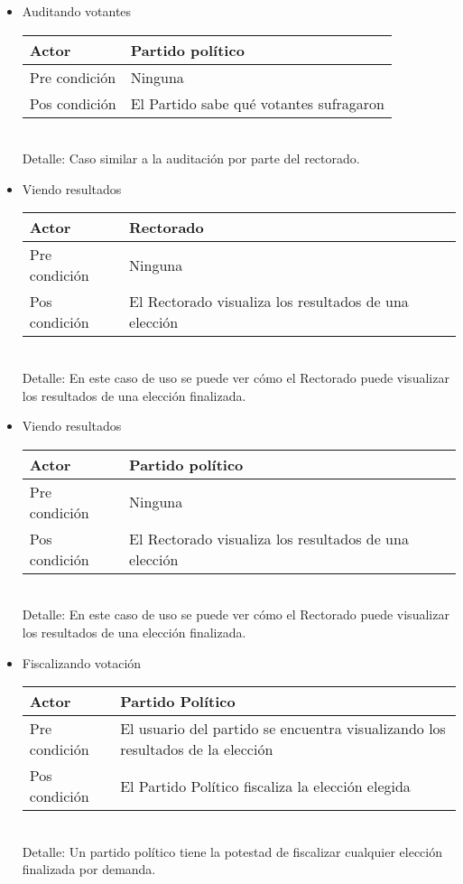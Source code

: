 \begin{itemize}
\bigskip
\item Auditando votantes
\begin{center}
\begin{tabular}{ll}
Actor & Partido político \\
\hline
Pre condición & Ninguna\\
\hline
Pos condición & El Partido sabe qu\'e votantes sufragaron \\
\hline
\end{tabular}
\medskip
\\
Detalle: Caso similar a la auditación por parte del rectorado.
\end{center} 

\bigskip
\item Viendo resultados
\begin{center}
\begin{tabular}{ll}
Actor & Rectorado \\
\hline
Pre condición & Ninguna\\
\hline
Pos condición & El Rectorado visualiza los resultados de una elección \\
\hline
\end{tabular}
\medskip
\\
Detalle: En este caso de uso se puede ver cómo el Rectorado puede visualizar los resultados de una elección finalizada.
\end{center} 

\bigskip
\item Viendo resultados
\begin{center}
\begin{tabular}{ll}
Actor & Partido político \\
\hline
Pre condición & Ninguna\\
\hline
Pos condición & El Rectorado visualiza los resultados de una elección \\
\hline
\end{tabular}
\medskip
\\
Detalle: En este caso de uso se puede ver cómo el Rectorado puede visualizar los resultados de una elección finalizada.
\end{center} 

\bigskip
\item Fiscalizando votaci\'on
\begin{center}
\begin{tabular}{ll}
Actor & Partido Político \\
\hline
Pre condición & El usuario del partido se encuentra visualizando los resultados de la elección\\
\hline
Pos condición & El Partido Político fiscaliza la elección elegida\\
\hline
\end{tabular}
\medskip
\\
Detalle: Un partido político tiene la potestad de fiscalizar cualquier elección finalizada por demanda.
\end{center}



\end{itemize}
